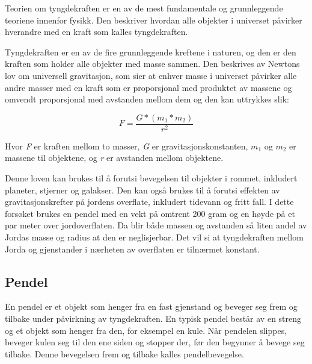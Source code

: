 \documentclass[twocolumn, 11pt]{article} %
\begin{document}

Teorien om tyngdekraften er en av de mest fundamentale og grunnleggende teoriene innenfor fysikk. Den beskriver hvordan alle objekter i universet påvirker hverandre med en kraft som kalles tyngdekraften.

Tyngdekraften er en av de fire grunnleggende kreftene i naturen, og den er den kraften som holder alle objekter med masse sammen. Den beskrives av Newtons lov om universell gravitasjon, som sier at enhver masse i universet påvirker alle andre masser med en kraft som er proporsjonal med produktet av massene og omvendt proporsjonal med avstanden mellom dem og den kan uttrykkes slik:

\begin{equation}
    F = \frac{G*(m_1*m_2)}{r^2}
    \label{universiell_tyngdekraft}
\end{equation}

Hvor \textit{F} er kraften mellom to masser, \textit{G} er gravitasjonskonstanten, \textit{$m_1$} og \textit{$m_2$} er massene til objektene, og \textit{r} er avstanden mellom objektene.

Denne loven kan brukes til å forutsi bevegelsen til objekter i rommet, inkludert planeter, stjerner og galakser. Den kan også brukes til å forutsi effekten av gravitasjonskrefter på jordens overflate, inkludert tidevann og fritt fall. I dette forsøket brukes en pendel med en vekt på omtrent 200 gram og en høyde på et par meter over jordoverflaten. Da blir både massen og avstanden så liten andel av Jordas masse og radius at den er neglisjerbar. Det vil si at tyngdekraften mellom Jorda og gjenstander i nærheten av overflaten er tilnærmet konstant. \cite{Gravitasjon}


\subsection{Pendel}
En pendel er et objekt som henger fra en fast gjenstand og beveger seg frem og tilbake under påvirkning av tyngdekraften. En typisk pendel består av en streng og et objekt som henger fra den, for eksempel en kule. Når pendelen slippes, beveger kulen seg til den ene siden og stopper der, før den begynner å bevege seg tilbake. Denne bevegelsen frem og tilbake kalles pendelbevegelse.
\end{document}
